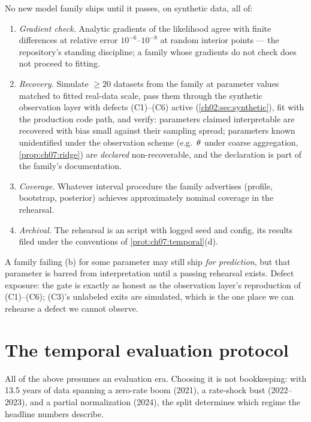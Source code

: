\begin{protocol}\label{prot:ch07:recovery}
No new model family ships until it passes, on synthetic data, all of:
\begin{enumerate}[label=(\alph*)]
\item \emph{Gradient check.} Analytic gradients of the likelihood agree
with finite differences at relative error $10^{-6}$--$10^{-8}$ at random
interior points --- the repository's standing discipline; a family whose
gradients do not check does not proceed to fitting.
\item \emph{Recovery.} Simulate $\ge 20$ datasets from the family at
parameter values matched to fitted real-data scale, pass them through
the synthetic observation layer with defects (C1)--(C6) active
(\cref{ch02:sec:synthetic}), fit with the production code path, and
verify: parameters claimed interpretable are recovered with bias small
against their sampling spread; parameters known unidentified under the
observation scheme (e.g.\ $\theta$ under coarse aggregation,
\cref{prop:ch07:ridge}) are \emph{declared} non-recoverable, and the
declaration is part of the family's documentation.
\item \emph{Coverage.} Whatever interval procedure the family advertises
(profile, bootstrap, posterior) achieves approximately nominal coverage
in the rehearsal.
\item \emph{Archival.} The rehearsal is an  script
with logged seed and config, its results filed under the conventions of
\cref{prot:ch07:temporal}(d).
\end{enumerate}
A family failing (b) for some parameter may still ship \emph{for
prediction}, but that parameter is barred from interpretation until a
passing rehearsal exists. Defect exposure: the gate is exactly as honest
as the observation layer's reproduction of (C1)--(C6); (C3)'s unlabeled
exits are simulated, which is the one place we can rehearse a defect we
cannot observe.
\end{protocol}

\section{The temporal evaluation protocol}\label{ch07:sec:temporal}

All of the above presumes an evaluation era. Choosing it is not
bookkeeping: with 13.5 years of data spanning a zero-rate boom (2021), a
rate-shock bust (2022--2023), and a partial normalization (2024), the
split determines which regime the headline numbers describe.

